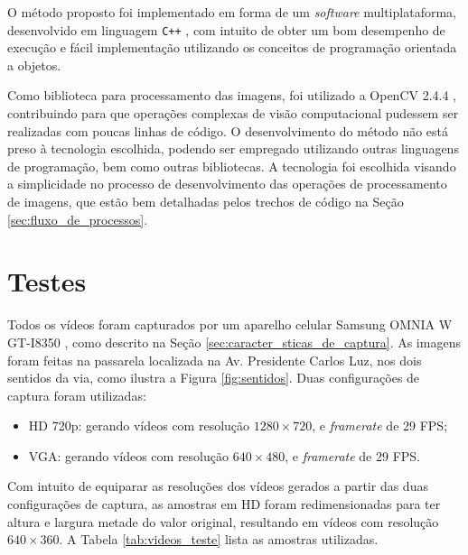 
O método proposto foi implementado em forma de um \textit{software} multiplataforma, desenvolvido em linguagem \verb!C++! \citep{cplusplus:2013:online}, com intuito de obter um bom desempenho de execução e fácil implementação utilizando os conceitos de programação orientada a objetos.

Como biblioteca para processamento das imagens, foi utilizado a OpenCV 2.4.4 \citep{opencv_library}, contribuindo para que operações complexas de visão computacional pudessem ser realizadas com poucas linhas de código. O desenvolvimento do método não está preso à tecnologia escolhida, podendo ser empregado utilizando outras linguagens de programação, bem como outras bibliotecas. A tecnologia foi escolhida visando a simplicidade no processo de desenvolvimento das operações de processamento de imagens, que estão bem detalhadas pelos trechos de código na Seção \ref{sec:fluxo_de_processos}.

\section{Testes} %
\label{sec:testes}

Todos os vídeos foram capturados por um aparelho celular Samsung OMNIA W GT-I8350 \citep{omnia:2013:online}, como descrito na Seção \ref{sec:caracter_sticas_de_captura}. As imagens foram feitas na passarela localizada na Av. Presidente Carlos Luz, nos dois sentidos da via, como ilustra a Figura \ref{fig:sentidos}. Duas configurações de captura foram utilizadas:

\begin{itemize}
  \item HD 720p: gerando vídeos com resolução $1280\times 720$, e \textit{framerate} de 29 FPS;
  \item VGA: gerando vídeos com resolução $640\times 480$, e \textit{framerate} de 29 FPS.
\end{itemize}

Com intuito de equiparar as resoluções dos vídeos gerados a partir das duas configurações de captura, as amostras em HD foram redimensionadas para ter altura e largura metade do valor original, resultando em vídeos com resolução $640\times 360$. A Tabela \ref{tab:videos_teste} lista as amostras utilizadas.


